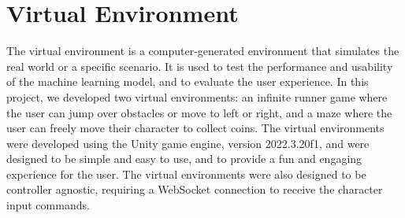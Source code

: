 \section{Virtual Environment}
The virtual environment is a computer-generated environment that simulates the real world or a specific scenario.
It is used to test the performance and usability of the machine learning model, and to evaluate the user experience.
In this project, we developed two virtual environments: an infinite runner game where the user can jump over obstacles or move to left or right, and a maze where the user can freely move their character to collect coins.
The virtual environments were developed using the Unity game engine, version 2022.3.20f1, and were designed to be simple and easy to use, and to provide a fun and engaging experience for the user.
The virtual environments were also designed to be controller agnostic, requiring a WebSocket connection to receive the character input commands.
